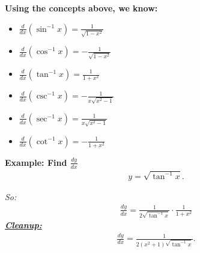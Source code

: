 \documentclass{report}
\begin{document}
  \pagebreak \bigbreak \noindent
  \begin{mdframed}
    \textbf{Using the concepts above, we know:}
    \begin{itemize}
      \item $\frac{d}{dx}(\sin^{-1}{x}) = \frac{1}{\sqrt{1-x^{2}}}$ 
      \item $\frac{d}{dx}(\cos^{-1}{x}) = -\frac{1}{\sqrt{1-x^{2}}}$ 
      \item $\frac{d}{dx}(\tan^{-1}{x}) = \frac{1}{1+x^{2}}$ 
      \item $\frac{d}{dx}(\csc^{-1}{x}) = -\frac{1}{x\sqrt{x^{2}-1}}$ 
      \item $\frac{d}{dx}(\sec^{-1}{x}) = \frac{1}{x\sqrt{x^{2}-1}}$ 
      \item $\frac{d}{dx}(\cot^{-1}{x}) = -\frac{1}{1+x^{2}}$ 
    \end{itemize}
  \end{mdframed}

  \bigbreak \noindent 
  \begin{mdframed}
    \textbf{Example: Find $\frac{dy}{dx}$}
    \begin{align*}
      y = \sqrt{\tan^{-1}{x}}
    .\end{align*}
  \end{mdframed}
  \bigbreak \noindent
  \textit{So:}
  \begin{align*}
    \frac{dy}{dx} = \frac{1}{2\sqrt{\tan^{-1}{x}}} \cdot \frac{1}{1+x^{2}}
  \end{align*}
  \textbf{\textit{\underline{Cleanup:}}}
  \begin{align*}
    \frac{dy}{dx} = \frac{1}{2(x^{2}+1)\sqrt{\tan^{-1}{x}}}
  .\end{align*}
\end{document}
